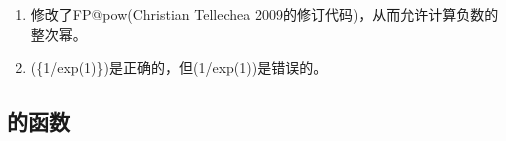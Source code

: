 \documentclass[../main.tex]{subfiles}
\begin{document}
\begin{enumerate}
 \item {}修改了FP@pow(Christian Tellechea 2009的修订代码)，从而允许计算负数的整次幂。


\item (\{1/exp(1)\})是正确的，但(1/exp(1))是错误的。
\end{enumerate}

\subsection{的函数}
\end{document}

